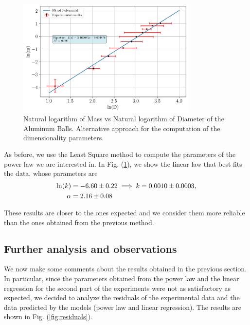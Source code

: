 \documentclass[a4paper,12pt]{article}
\begin{document}
\begin{figure}[h!]
    \centering
    \includegraphics[width = 0.8\textwidth]{ln_mass_vs_ln_diameter.png}
    \caption{Natural logarithm of Mass vs Natural logarithm of Diameter of the Aluminum Balls. Alternative approach for the computation of the dimensionality parameters.}
    \label{fig:ln_mass_vs_ln_diameter}
\end{figure}

As before, we use the Least Square method to compute the parameters of the power law we are interested in.
In Fig. (\ref{fig:ln_mass_vs_ln_diameter}), we show the linear law that best fits the data, whose parameters are 
\begin{align}
    \ln(k) &= -6.60 \pm 0.22 \implies k = 0.0010 \pm 0.0003,  \\ \notag
    \alpha &= 2.16 \pm  0.08
\end{align}


These results are closer to the ones expected and we consider them more reliable than the ones obtained from the previous method.
 
\subsection{Further analysis and observations}\label{sec:Further_analysis}

We now make some comments about the results obtained in the previous section. In particular, 
since the parameters obtained from the power law and the linear regression for the second part of the 
experiments were not as satisfactory as expected, we decided to analyze the residuals of the experimental 
data and the data predicted by the models (power law and linear regression). The results are shown in 
Fig. (\ref{fig:residuals}).
\end{document}
